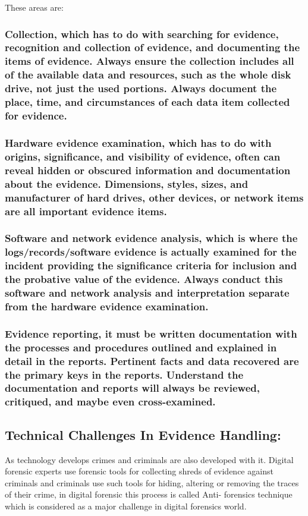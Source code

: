 \documentclass[british]{article}
\begin{document}
These areas are:

\subsubsection{Collection, which has to do with searching for evidence, recognition
	and collection of evidence, and documenting the items of evidence.
	Always ensure the collection includes all of the available data and
	resources, such as the whole disk drive, not just the used portions.
	Always document the place, time, and circumstances of each data item
	collected for evidence.}

\subsubsection{Hardware evidence examination, which has to do with origins, significance,
	and visibility of evidence, often can reveal hidden or obscured information
	and documentation about the evidence. Dimensions, styles, sizes, and
	manufacturer of hard drives, other devices, or network items are all
	important evidence items.}

\subsubsection{Software and network evidence analysis, which is where the logs/records/software
	evidence is actually examined for the incident providing the significance
	criteria for inclusion and the probative value of the evidence. Always
	conduct this software and network analysis and interpretation separate
	from the hardware evidence examination.}

\subsubsection{Evidence reporting, it must be written documentation with the processes
	and procedures outlined and explained in detail in the reports. Pertinent
	facts and data recovered are the primary keys in the reports. Understand
	the documentation and reports will always be reviewed, critiqued,
	and maybe even cross-examined.}

\pagebreak{}

\subsection{Technical Challenges In Evidence Handling:}

As technology develops crimes and criminals are also developed with
it. Digital forensic experts use forensic tools for collecting shreds
of evidence against criminals and criminals use such tools for hiding,
altering or removing the traces of their crime, in digital forensic
this process is called Anti- forensics technique which is considered
as a major challenge in digital forensics world.
\end{document}
